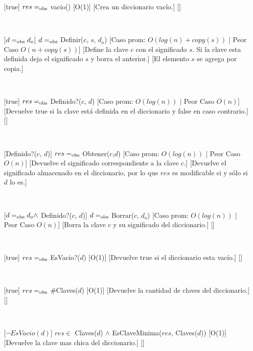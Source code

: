 \begin{Interfaz}

[true]
{$res =_{\mathrm{obs}}$ vacio()}
[O(1)]
[Crea un diccionario vacío.]
[]

~

[$d =_{\mathrm{obs}} d_o$]
{$d =_{\mathrm{obs}}$ Definir($c$, $s$, $d_o$)}
[Caso prom: $O(log(n) + copy(s))$ | Peor Caso $O(n + copy(s))$]
[Define la clave $c$ con el significado $s$. Si la clave esta definida deja el significado $s$ y borra el anterior.]
[El elemento $s$ se agrega por copia.]

~

[true]
{$res =_{\mathrm{obs}}$ Definido?($c$, $d$)}
[Caso prom: $O(log(n))$ | Peor Caso $O(n)$]
[Devuelve true si la clave está definida en el diccionario y false en caso contrario.]
[]

~

[Definido?($c$, $d$)]
{$res =_{\mathrm{obs}}$ Obtener($c$,$d$)}
[Caso prom: $O(log(n))$ | Peor Caso $O(n)$]
[Devuelve el significado correspondiente a la clave $c$.]
[Devuelve el significado almacenado en el diccionario, por lo que $res$ es modificable si y sólo si $d$ lo es.]

~

[$d =_{\mathrm{obs}} d_o \land$ Definido?($c$, $d$)]
{$d =_{\mathrm{obs}}$ Borrar($c$, $d_o$)}
[Caso prom: $O(log(n))$ | Peor Caso $O(n)$]
[Borra la clave $c$ y su significado del diccionario.]
[]

~

[true]
{$res =_{\mathrm{obs}}$ EsVacio?($d$)}
[O(1)]
[Devuelve true si el diccionario esta vacío.]
[]

~

[true]
{$res =_{\mathrm{obs}}$ \#Claves($d$)}
[O(1)]
[Devuelve la cantidad de claves del diccionario.]
[]

~

[$\neg EsVacio(d)$]
{$res \in$ Claves($d$) $\land$ EsClaveMinima($res$, Claves($d$))}
[O(1)]
[Devuelve la clave mas chica del diccionario.]
[]

~


\end{Interfaz}
